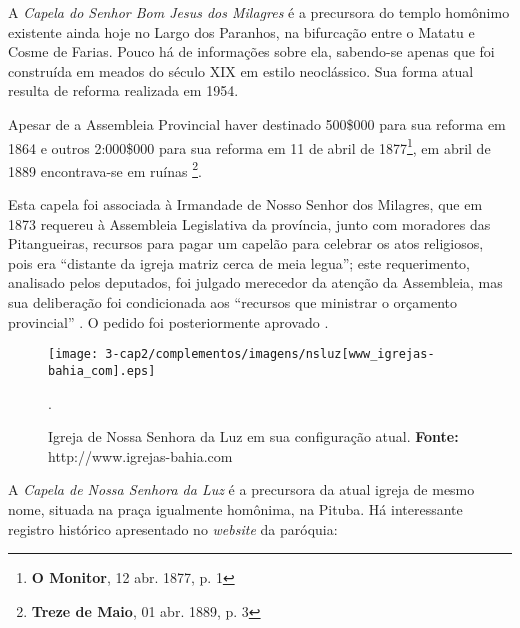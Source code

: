 A \textit{Capela do Senhor Bom Jesus dos Milagres} é a precursora do templo homônimo existente ainda hoje no Largo dos Paranhos, na bifurcação entre o Matatu e Cosme de Farias. Pouco há de informações sobre ela, sabendo-se apenas que foi construída em meados do século XIX em estilo neoclássico. Sua forma atual resulta de reforma realizada em 1954.

Apesar de a Assembleia Provincial haver destinado 500\$000 para sua reforma em 1864 \cite[anexo~2, p.~2]{silvagomes_relatorio_1864} e outros 2:000\$000 para sua reforma em 11 de abril de 1877\footnote{\textbf{O Monitor}, 12 abr. 1877, p. 1}, em abril de 1889 encontrava-se em ruínas \footnote{\textbf{Treze de Maio}, 01 abr. 1889, p. 3}. 

Esta capela foi associada à Irmandade de Nosso Senhor dos Milagres, que em 1873 requereu à Assembleia Legislativa da província, junto com moradores das Pitangueiras, recursos para pagar um capelão para celebrar os atos religiosos, pois era ``distante da igreja matriz cerca de meia legua''; este requerimento, analisado pelos deputados, foi julgado merecedor da atenção da Assembleia, mas sua deliberação foi condicionada aos ``recursos que ministrar o orçamento provincial'' \cite[p.~46]{bahia_relatassleg_1873}. O pedido foi posteriormente aprovado \cite[p.~53]{bahia_relatassleg_1873}.

\begin{figure}[!htp]
\centering
\texttt{[image: 3-cap2/complementos/imagens/nsluz[www\_igrejas-bahia\_com].eps]} 
\caption{Igreja de Nossa Senhora da Luz em sua configuração atual. \textbf{Fonte:} http://www.igrejas-bahia.com}.
\end{figure}

A \textit{Capela de Nossa Senhora da Luz} é a precursora da atual igreja de mesmo nome, situada na praça igualmente homônima, na Pituba. Há interessante registro histórico apresentado no \textit{website} da paróquia:

